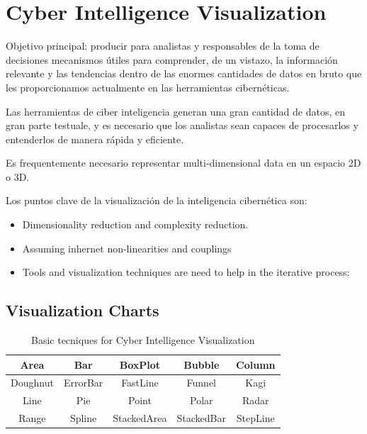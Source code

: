 \chapter{Cyber Intelligence Visualization}

Objetivo principal: producir para analistas y responsables de la toma de decisiones mecanismos útiles para
comprender, de un vistazo, la información relevante y las tendencias dentro de las enormes cantidades
de datos en bruto que les proporcionamos actualmente en las herramientas cibernéticas.

Las herramientas  de ciber inteligencia generan una gran cantidad de datos, en gran parte testuale, y es necesario que los analistas sean capaces de procesarlos y entenderlos de manera rápida y eficiente.

Es frequentemente necesario representar multi-dimensional data en un espacio 2D o 3D.

Los puntos clave de la visualización de la inteligencia cibernética son:
\begin{itemize}
   \item Dimensionality reduction and complexity reduction.
   \item Assuming inhernet non-linearities and couplings
   \item Tools and visualization techniques are need to help in the iterative process:
   
\end{itemize}

\section{Visualization Charts}
\begin{table}[htbp]
   \centering
   \begin{tabular}{|c|c|c|c|c|}
\hline Area     & Bar       & BoxPlot      & Bubble       & Column \\
\hline Doughnut & ErrorBar  & FastLine     & Funnel       & Kagi \\
\hline Line     & Pie       & Point        & Polar        & Radar \\
\hline Range    & Spline    & StackedArea  & StackedBar   & StepLine\\
\hline
   \end{tabular}
   \caption{Basic tecniques for Cyber Intelligence Visualization}
   \label{tab:03/tecnicasVisualizacion}
\end{table}

